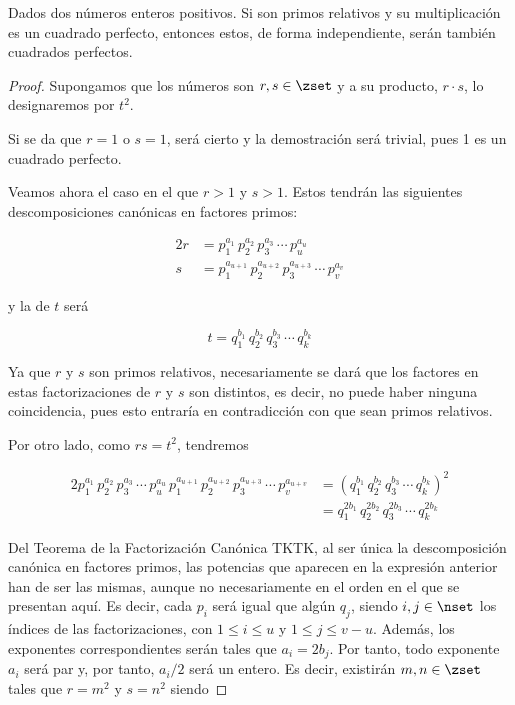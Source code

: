 \begin{proposition}\label{prod-cuadrado-perfecto}
  Dados dos números enteros positivos. Si son primos relativos y su
  multiplicación es un cuadrado perfecto, entonces estos, de forma
  independiente, serán también cuadrados perfectos.
\end{proposition}

\begin{proof}
  Supongamos que los números son $r, s \in \zset$ y a su producto, $r \cdot
  s$, lo designaremos por $t^2$.

  Si se da que $r = 1$ o $s = 1$, será cierto y la demostración será
  trivial, pues 1 es un cuadrado perfecto.

  Veamos ahora el caso en el que $r > 1$ y $s > 1$. Estos tendrán las
  siguientes descomposiciones canónicas en factores primos:

  \begin{alignat*}{2}
    r &= p_1^{a_1} \, p_2^{a_2} \, p_3^{a_3} \, \cdots \, p_u^{a_u} \\
    s &= p_1^{a_{u+1}} \, p_2^{a_{u+2}} \, p_3^{a_{u+3}} \, \cdots \, p_v^{a_v}
  \end{alignat*}

  \noindent y la de $t$ será

  $$ t = q_1^{b_1} \, q_2^{b_2} \, q_3^{b_3} \, \cdots \, q_k^{b_k} $$

  Ya que $r$ y $s$ son primos relativos, necesariamente se dará que los
  factores en estas factorizaciones de $r$ y $s$ son distintos, es decir, no
  puede haber ninguna coincidencia, pues esto entraría en contradicción con
  que sean primos relativos.

  Por otro lado, como $rs = t^2$, tendremos

  \begin{alignat*}{2}
    p_1^{a_1} \, p_2^{a_2} \, p_3^{a_3} \, \cdots \, p_u^{a_u} \,
      p_1^{a_{u+1}} \, p_2^{a_{u+2}} \, p_3^{a_{u+3}} \, \cdots \,
      p_v^{a_{u+v}}
      &= \left( q_1^{b_1} \, q_2^{b_2} \, q_3^{b_3} \, \cdots \, q_k^{b_k}
        \right)^2 \\
      &= q_1^{2b_1} \, q_2^{2b_2} \, q_3^{2b_3} \, \cdots \, q_k^{2b_k}
  \end{alignat*}

  Del Teorema de la Factorización Canónica TKTK, al ser única la
  descomposición canónica en factores primos, las potencias que aparecen en
  la expresión anterior han de ser las mismas, aunque no necesariamente en
  el orden en el que se presentan aquí. Es decir, cada $p_i$ será igual que
  algún $q_j$, siendo $i, j \in \nset$ los índices de las factorizaciones,
  con $1 \leq i \leq u$ y $1 \leq j \leq v - u$. Además, los exponentes
  correspondientes serán tales que $a_i = 2b_j$. Por tanto, todo exponente
  $a_i$ será par y, por tanto, $a_i/2$ será un entero. Es decir, existirán
  $m, n \in \zset$ tales que $r = m^2$ y $s = n^2$ siendo


\end{proof}
